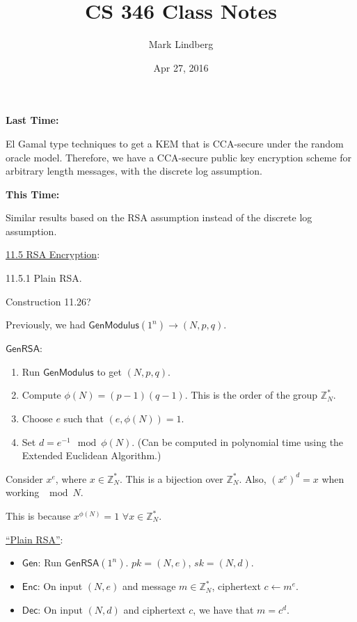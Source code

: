 \documentclass[12pt]{article}
\newcommand{\Z}{\mathbb{Z}}
\newcommand{\Enc}{\mathsf{Enc}}
\newcommand{\Dec}{\mathsf{Dec}}
\newcommand{\Gen}{\mathsf{Gen}}
\newcommand{\GenRSA}{\mathsf{GenRSA}}
\newcommand{\GenM}{\mathsf{GenModulus}}
\newcommand{\from}{\leftarrow}
\begin{document}
\title{CS 346 Class Notes}
\date{Apr 27, 2016}
\author{Mark Lindberg}
\maketitle
\thispagestyle{fancy}

{\bf Last Time:}

El Gamal type techniques to get a KEM that is CCA-secure under the random oracle model. Therefore, we have a CCA-secure public key encryption scheme for arbitrary length messages, with the discrete log assumption.

{\bf This Time:}

Similar results based on the RSA assumption instead of the discrete log assumption.

\underline{11.5 RSA Encryption}:

11.5.1 Plain RSA.

Construction 11.26?

Previously, we had $\GenM(1^n)\to(N,p,q)$.

$\GenRSA$:\begin{enumerate}

\item Run $\GenM$ to get $(N,p,q)$.

\item Compute $\phi(N)=(p-1)(q-1)$. This is the order of the group $\Z_N^*$.

\item Choose $e$ such that $(e,\phi(N))=1$.

\item Set $d=e^{-1}\mod{\phi(N)}$. (Can be computed in polynomial time using the Extended Euclidean Algorithm.)

\end{enumerate}

Consider $x^e$, where $x\in\Z_N^*$. This is a bijection over $\Z_N^*$. Also, $(x^e)^d=x$ when working $\mod{N}$.

This is because $x^{\phi(N)}=1$ $\forall x\in\Z_N^*$.

\underline{``Plain RSA''}:\begin{itemize}

\item $\Gen$: Run $\GenRSA(1^n)$. $pk=(N,e)$, $sk=(N,d)$.

\item $\Enc$:  On input $(N,e)$ and message $m\in\Z_{N}^*$, ciphertext $c\from m^e$.

\item $\Dec$: On input $(N,d)$ and ciphertext $c$, we have that $m=c^d$.

\end{itemize}
\end{document}

